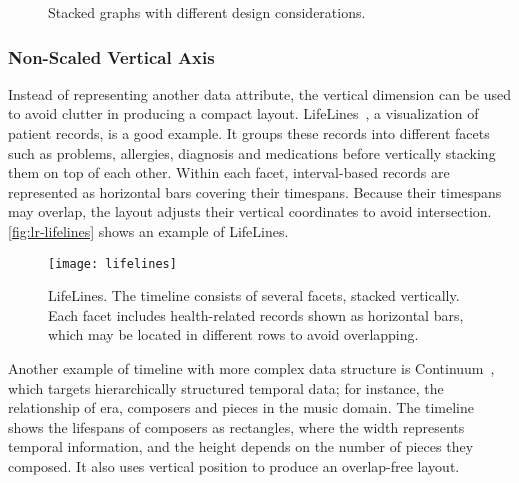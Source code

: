 \begin{figure}[!htb]
\centering
{}

\vspace{0.5cm}


\vspace{0.5cm}

\caption{Stacked graphs with different design considerations. }
\label{fig:lr-streamgraph}
\end{figure}

\subsubsection{Non-Scaled Vertical Axis}
Instead of representing another data attribute, the vertical dimension can be used to avoid clutter in producing a compact layout. LifeLines~\cite{Plaisant1996,Plaisant1998}, a visualization of patient records, is a good example. It groups these records into different facets such as problems, allergies, diagnosis and medications before vertically stacking them on top of each other. Within each facet, interval-based records are represented as horizontal bars covering their timespans. Because their timespans may overlap, the layout adjusts their vertical coordinates to avoid intersection. \autoref{fig:lr-lifelines} shows an example of LifeLines. 

\begin{figure}[!htb]
	\centering
	\texttt{[image: lifelines]}
	\caption{LifeLines. The timeline consists of several facets, stacked vertically. Each facet includes health-related records shown as horizontal bars, which may be located in different rows to avoid overlapping. }
	\label{fig:lr-lifelines}
\end{figure}

Another example of timeline with more complex data structure is Continuum~\cite{Andre2007}, which targets hierarchically structured temporal data; for instance, the relationship of era, composers and pieces in the music domain. The timeline shows the lifespans of composers as rectangles, where the width represents temporal information, and the height depends on the number of pieces they composed. It also uses vertical position to produce an overlap-free layout.

